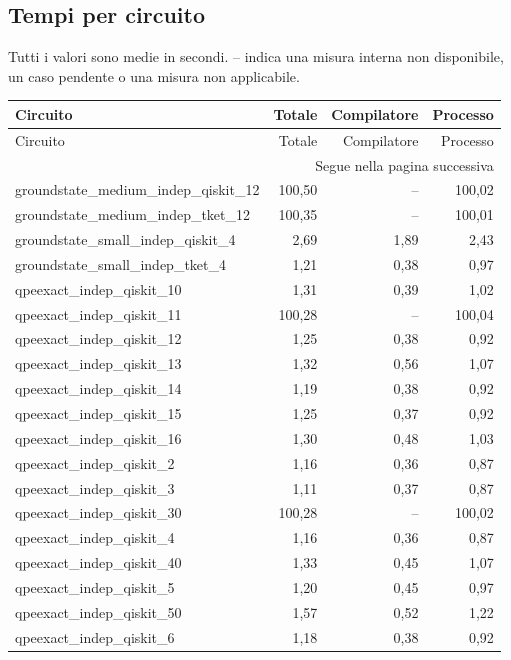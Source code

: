 \subsection{Tempi per circuito}
Tutti i valori sono medie in secondi. -- indica una misura interna non disponibile, un caso pendente o una misura non applicabile.
\begingroup\footnotesize
\setlength{\tabcolsep}{5pt}
\begin{longtable}{lrrr}
\toprule
Circuito & Totale & Compilatore & Processo \\
\midrule
\endfirsthead
\toprule
Circuito & Totale & Compilatore & Processo \\
\midrule\endhead
\midrule\multicolumn{4}{r}{\footnotesize Segue nella pagina successiva}\\
\endfoot
\bottomrule\endlastfoot
groundstate\_medium\_indep\_qiskit\_12 & 100,50 & -- & 100,02 \\
groundstate\_medium\_indep\_tket\_12 & 100,35 & -- & 100,01 \\
groundstate\_small\_indep\_qiskit\_4 & 2,69 & 1,89 & 2,43 \\
groundstate\_small\_indep\_tket\_4 & 1,21 & 0,38 & 0,97 \\
qpeexact\_indep\_qiskit\_10 & 1,31 & 0,39 & 1,02 \\
qpeexact\_indep\_qiskit\_11 & 100,28 & -- & 100,04 \\
qpeexact\_indep\_qiskit\_12 & 1,25 & 0,38 & 0,92 \\
qpeexact\_indep\_qiskit\_13 & 1,32 & 0,56 & 1,07 \\
qpeexact\_indep\_qiskit\_14 & 1,19 & 0,38 & 0,92 \\
qpeexact\_indep\_qiskit\_15 & 1,25 & 0,37 & 0,92 \\
qpeexact\_indep\_qiskit\_16 & 1,30 & 0,48 & 1,03 \\
qpeexact\_indep\_qiskit\_2 & 1,16 & 0,36 & 0,87 \\
qpeexact\_indep\_qiskit\_3 & 1,11 & 0,37 & 0,87 \\
qpeexact\_indep\_qiskit\_30 & 100,28 & -- & 100,02 \\
qpeexact\_indep\_qiskit\_4 & 1,16 & 0,36 & 0,87 \\
qpeexact\_indep\_qiskit\_40 & 1,33 & 0,45 & 1,07 \\
qpeexact\_indep\_qiskit\_5 & 1,20 & 0,45 & 0,97 \\
qpeexact\_indep\_qiskit\_50 & 1,57 & 0,52 & 1,22 \\
qpeexact\_indep\_qiskit\_6 & 1,18 & 0,38 & 0,92 \\

\end{longtable}

